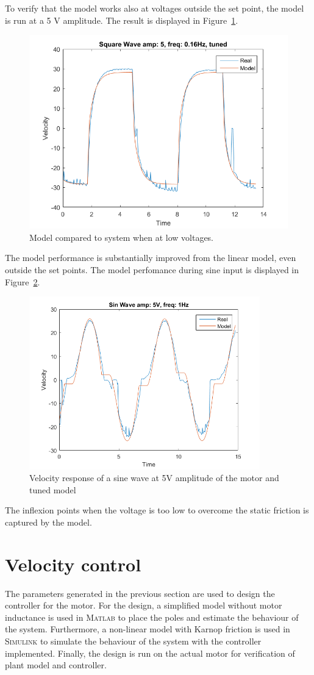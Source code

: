 \documentclass[12pt,a4paper]{article}
\begin{document}
To verify that the model works also at voltages outside the set point, the model
is run at a 5 V amplitude. The result is displayed in
Figure~\ref{fig:l2_sq_a5_f016_fctuned}.
\begin{figure}[H]
    \centering
    \includegraphics[width=0.5\linewidth]{l2_sq_a5_f016_fctuned.png}
    \caption{Model compared to system when at low voltages.}
    \label{fig:l2_sq_a5_f016_fctuned}
\end{figure}
The model performance is substantially improved from the linear model, even
outside the set points. The model perfomance during sine input is displayed in
Figure~\ref{fig:l2_sin_a5_f1}.
\begin{figure}[H]
    \centering
    \includegraphics[width=100mm]{l2_sin_a5_f1.png}
    \caption{Velocity response of a sine wave at 5V amplitude of the
    motor and tuned model}
    \label{fig:l2_sin_a5_f1}
\end{figure} 
The inflexion points when the voltage is too low to overcome the static friction
is captured by the model.

\section*{Velocity control}
\label{sec:velocity_control}
The parameters generated in the previous section are used to design the
controller for the motor. For the design, a simplified model without motor
inductance is used in \textsc{Matlab} to place the poles and estimate the
behaviour of the system. Furthermore, a non-linear model with Karnop friction is
used in \textsc{Simulink} to simulate the behaviour of the system with the
controller implemented. Finally, the design is run on the actual motor for
verification of plant model and controller.
\end{document}
